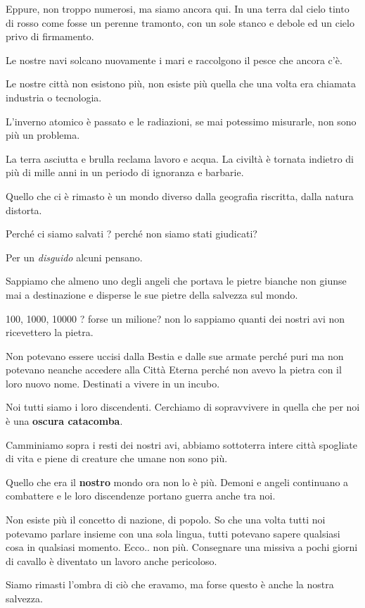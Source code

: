 \documentclass[12pt,a4paper,twoside,openany]{book}
\begin{document}
\begin{multicols}{2}
Eppure, non troppo numerosi, ma siamo ancora qui. In una terra dal cielo tinto di rosso come fosse un perenne tramonto, con un sole stanco e debole ed un cielo privo di firmamento.

Le nostre navi solcano nuovamente i mari e raccolgono il pesce che ancora c'è.

Le nostre città non esistono più, non esiste più quella che una volta era chiamata industria o tecnologia.

L'inverno atomico è passato e le radiazioni, se mai potessimo misurarle, non sono più un problema.

La terra asciutta e brulla reclama lavoro e acqua. La civiltà è tornata indietro di più di mille anni in un periodo di ignoranza e barbarie.

Quello che ci è rimasto è un mondo diverso dalla geografia riscritta, dalla natura distorta.

Perché ci siamo salvati ? perché non siamo stati giudicati?

Per un \textit{disguido} alcuni pensano.

Sappiamo che almeno uno degli angeli che portava le pietre bianche non giunse mai a destinazione e disperse le sue pietre della salvezza sul mondo.

100, 1000, 10000 ? forse un milione?  non lo sappiamo quanti dei nostri avi non ricevettero la pietra.

Non potevano essere uccisi dalla Bestia e dalle sue armate perché puri ma non potevano neanche accedere alla Città Eterna perché non avevo la pietra con il loro nuovo nome. Destinati a vivere in un incubo.

Noi tutti siamo i loro discendenti. Cerchiamo di sopravvivere in quella che per noi è una \textbf{oscura catacomba}.

Camminiamo sopra i resti dei nostri avi, abbiamo sottoterra intere città spogliate di vita e piene di creature che umane non sono più.

Quello che era il \textbf{nostro} mondo ora non lo è più. Demoni e angeli continuano a combattere e le loro discendenze portano guerra anche tra noi.

Non esiste più il concetto di nazione, di popolo. So che una volta tutti noi potevamo parlare insieme con una sola lingua, tutti potevano sapere qualsiasi cosa in qualsiasi momento.
Ecco.. non più. Consegnare una missiva a pochi giorni di cavallo è diventato un lavoro anche pericoloso.

Siamo rimasti l'ombra di ciò che eravamo, ma forse questo è anche la nostra salvezza. 


\end{multicols}
\end{document}

